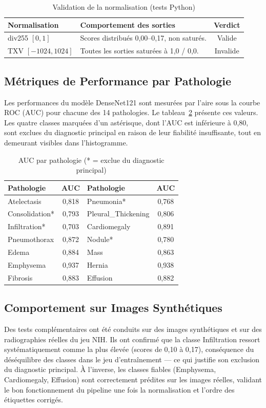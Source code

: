 \documentclass[12pt,a4paper]{report}
\begin{document}
\begin{table}[H]
\centering
\caption{Validation de la normalisation (tests Python)}
\label{tab:norm}
\begin{tabularx}{\textwidth}{l X c}
\toprule
\textbf{Normalisation} & \textbf{Comportement des sorties} & \textbf{Verdict} \\
\midrule
div255 $[0,1]$ & Scores distribués 0,00--0,17, non saturés. & Valide \\
TXV $[-1024,1024]$ & Toutes les sorties saturées à 1,0 / 0,0. & Invalide \\
\bottomrule
\end{tabularx}
\end{table}

\subsection{Métriques de Performance par Pathologie}
Les performances du modèle DenseNet121 sont mesurées par l'aire sous la courbe ROC (AUC) pour chacune des 14 pathologies. Le tableau~\ref{tab:auc} présente ces valeurs. Les quatre classes marquées d'un astérisque, dont l'AUC est inférieure à 0,80, sont exclues du diagnostic principal en raison de leur fiabilité insuffisante, tout en demeurant visibles dans l'histogramme.

\begin{table}[H]
\centering
\caption{AUC par pathologie (* = exclue du diagnostic principal)}
\label{tab:auc}
\begin{tabularx}{\textwidth}{X c X c}
\toprule
\textbf{Pathologie} & \textbf{AUC} & \textbf{Pathologie} & \textbf{AUC} \\
\midrule
Atelectasis & 0,818 & Pneumonia* & 0,768 \\
Consolidation* & 0,793 & Pleural\_Thickening & 0,806 \\
Infiltration* & 0,703 & Cardiomegaly & 0,891 \\
Pneumothorax & 0,872 & Nodule* & 0,780 \\
Edema & 0,884 & Mass & 0,863 \\
Emphysema & 0,937 & Hernia & 0,938 \\
Fibrosis & 0,883 & Effusion & 0,882 \\
\bottomrule
\end{tabularx}
\end{table}

\subsection{Comportement sur Images Synthétiques}
Des tests complémentaires ont été conduits sur des images synthétiques et sur des radiographies réelles du jeu NIH. Ils ont confirmé que la classe Infiltration ressort systématiquement comme la plus élevée (scores de 0,10 à 0,17), conséquence du déséquilibre des classes dans le jeu d'entraînement --- ce qui justifie son exclusion du diagnostic principal. À l'inverse, les classes fiables (Emphysema, Cardiomegaly, Effusion) sont correctement prédites sur les images réelles, validant le bon fonctionnement du pipeline une fois la normalisation et l'ordre des étiquettes corrigés.
\end{document}
